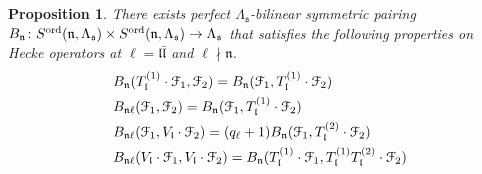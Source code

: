 \documentclass[leqno]{amsart}
\newcommand{\euF}{\EuScript{F}} %
\newcommand{\ord}{\textnormal{ord}}
\newcommand{\fs}{\mathfrak{s}}
\newcommand{\fn}{\mathfrak{n}}
\newcommand{\fl}{\mathfrak{l}}
\newtheorem{prop}[thm]{Proposition}
\theoremstyle{definition}
\theoremstyle{remark}
\begin{document}
\begin{prop}
	There exists perfect $\Lambda_{\fs}$-bilinear
	symmetric pairing 
	$B_\fn\colon 
	S^{\ord}(\fn,\Lambda_{\fs})\times
	S^{\ord}(\fn,\Lambda_{\fs})\to \Lambda_{\fs}$
	that satisfies the following properties
	on Hecke operators at $\ell=\fl\bar{\fl}$ 
	and $\ell\nmid \fn$.
	\begin{align*}
	&B_{\fn}(T_{\fl}^{(1)}\cdot\euF_1,\euF_2)=
	B_{\fn}(\euF_1,T_{\fl}^{(1)}\cdot\euF_2)\\
	&B_{\fn\ell}(\euF_1,\euF_2)=
	B_{\fn}(\euF_1,T_{\fl}^{(1)}\cdot \euF_2)\\
	&B_{\fn\ell}(\euF_1,V_{\fl}\cdot\euF_2)=
	(q_\ell+1) B_{\fn}(\euF_1,
	T_{\fl}^{(2)}\cdot\euF_2)\\
	&B_{\fn\ell}(V_{\fl}\cdot \euF_1,V_{\fl}\cdot\euF_2)=
	B_{\fn} (T_{\fl}^{(1)}\cdot\euF_1,
	T_{\fl}^{(1)}T_{\fl}^{(2)}\cdot \euF_2)
	\end{align*}
\end{prop}
\end{document}
